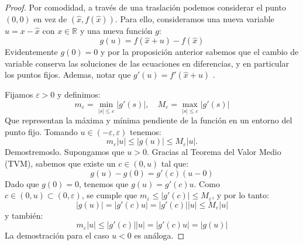 \documentclass[12pt,a4paper]{report}
\theoremstyle{definition}
\begin{document}
\begin{proof}
Por comodidad, a través de una traslación podemos considerar el punto $(0,0)$ en vez de $(\hat{x},f(\hat{x}))$. Para ello, consideramos una nueva variable $ u = x - \hat{x}$ con $x \in \mathbb{R} $ y una nueva función $g$: 
$$
g(u) = f(\hat{x} + u) - f(\hat{x}) 
$$
%
Evidentemente $g(0)=0$ y por la proposición anterior sabemos que el cambio de variable conserva las soluciones de las ecuaciones en diferencias, y en particular los puntos fijos. Ademas, notar que $g'(u) = f'(\hat{x} + u)$ .
 
Fijamos $\varepsilon > 0 $ y definimos:
$$
m_\varepsilon =  \min_{|s| \leq \varepsilon}|g'(s)|, \quad M_\varepsilon = \max_{|s| \leq \varepsilon}|g'(s) |
$$
%
Que representan la máxima y mínima pendiente de la función en un entorno del punto fijo. Tomando \( u \in (-\varepsilon,\varepsilon)\) tenemos:
\[
m_\varepsilon |u| \leq |g(u)| \leq M_\varepsilon |u|.
\]
%
Demostremoslo. Supongamos que \( u > 0 \). Gracias al Teorema del Valor Medio (TVM), sabemos que existe un \( c \in (0,u) \) tal que:
\[
g(u) - g(0) = g'(c)(u - 0)
\]
%
Dado que \( g(0) = 0 \), tenemos que \( g(u) = g'(c)u \). Como \( c \in (0,u) \subset (0,\varepsilon) \), se cumple que \( m_\varepsilon \leq |g'(c)| \leq M_\varepsilon \), y por lo tanto:
\[
|g(u)| = |g'(c)u| = |g'(c)| |u| \leq M_\varepsilon |u|
\]
%
y también:
\[
m_\varepsilon |u| \leq |g'(c)| |u| = |g'(c)u| = |g(u)|
\]
%
La demostración para el caso \( u < 0 \) es análoga.


\end{proof}
\end{document}

